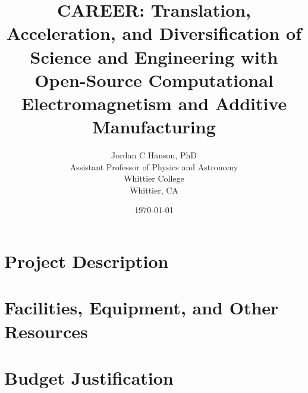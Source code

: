 \documentclass[10pt,twoside,openany]{book}
\title{CAREER: Translation, Acceleration, and Diversification of Science and Engineering with Open-Source Computational Electromagnetism and Additive Manufacturing}
\author{Jordan C Hanson, PhD \\ Assistant Professor of Physics and Astronomy \\ Whittier College \\ Whittier, CA}
\date{\today}
\begin{document}
\begin{flushleft}

\end{flushleft}

\begin{flushleft}

\end{flushleft}

\maketitle
\tableofcontents
\thispagestyle{empty}

\chapter{Project Description}
\thispagestyle{empty}
\begin{flushleft}

\end{flushleft}

\chapter{Facilities, Equipment, and Other Resources}
\thispagestyle{empty}
\begin{flushleft}

\end{flushleft}

\chapter{Budget Justification}
\thispagestyle{empty}
\begin{flushleft}

\end{flushleft}

\small


 
\end{document}
